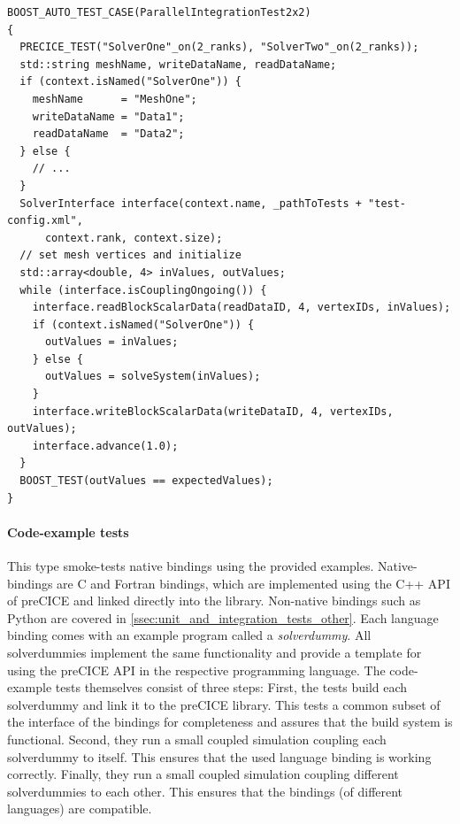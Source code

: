 \begin{listing}[h!]
\begin{verbatim}
BOOST_AUTO_TEST_CASE(ParallelIntegrationTest2x2)
{
  PRECICE_TEST("SolverOne"_on(2_ranks), "SolverTwo"_on(2_ranks));
  std::string meshName, writeDataName, readDataName;
  if (context.isNamed("SolverOne")) {
    meshName      = "MeshOne";
    writeDataName = "Data1";
    readDataName  = "Data2";
  } else {
    // ...
  }
  SolverInterface interface(context.name, _pathToTests + "test-config.xml",
      context.rank, context.size);
  // set mesh vertices and initialize
  std::array<double, 4> inValues, outValues;
  while (interface.isCouplingOngoing()) {
    interface.readBlockScalarData(readDataID, 4, vertexIDs, inValues);
    if (context.isNamed("SolverOne")) {
      outValues = inValues;
    } else {
      outValues = solveSystem(inValues);
    }
    interface.writeBlockScalarData(writeDataID, 4, vertexIDs, outValues);
    interface.advance(1.0);
  }
  BOOST_TEST(outValues == expectedValues);
}
\end{verbatim}
\caption{Example integration test involving two parallel participants  and  running on two ranks each.
  The  object provides information about the identity of the current rank.
  This information is used to setup further local information such as mesh and data names.
  Integration tests then directly construct a  and use preCICE API calls to run the test.
}
\label{lst:example-integration-test}
\end{listing}

\paragraph{Code-example tests} This type smoke-tests native bindings using the provided examples.
Native-bindings are C and Fortran bindings, which are implemented using the C++ API of preCICE and linked directly into the library.
Non-native bindings such as Python are covered in \autoref{ssec:unit_and_integration_tests_other}.
Each language binding comes with an example program called a \emph{solverdummy}. All solverdummies implement the same functionality and provide a template for using the preCICE API in the respective programming language.
The code-example tests themselves consist of three steps:
First, the tests build each solverdummy and link it to the preCICE library. This tests a common subset of the interface of the bindings for completeness and assures that the build system is functional.
Second, they run a small coupled simulation coupling each solverdummy to itself. This ensures that the used language binding is working correctly.
Finally, they run a small coupled simulation coupling different solverdummies to each other. This ensures that the bindings (of different languages) are compatible.

